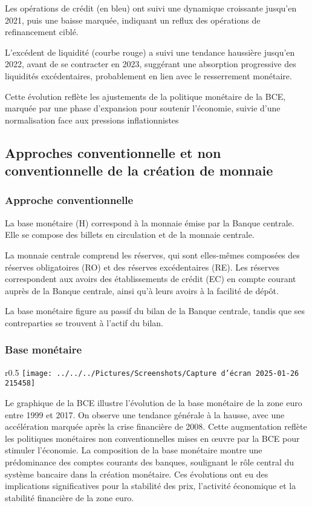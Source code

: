 \documentclass[a4paper, 12pt]{report}
\begin{document}
Les opérations de crédit (en bleu) ont suivi une dynamique croissante jusqu’en 2021, puis une baisse marquée, indiquant un reflux des opérations de refinancement ciblé.  

L’excédent de liquidité (courbe rouge) a suivi une tendance haussière jusqu’en 2022, avant de se contracter en 2023, suggérant une absorption progressive des liquidités excédentaires, probablement en lien avec le resserrement monétaire.  

Cette évolution reflète les ajustements de la politique monétaire de la BCE, marquée par une phase d’expansion pour soutenir l’économie, suivie d’une normalisation face aux pressions inflationnistes

\subsection{Approches conventionnelle et non conventionnelle de la création de monnaie}
	
\subsubsection{Approche conventionnelle}



La base monétaire (H) correspond à la monnaie émise par la Banque centrale. Elle se compose des billets en circulation et de la monnaie centrale.

La monnaie centrale comprend les réserves, qui sont elles-mêmes composées des réserves obligatoires (RO) et des réserves excédentaires (RE). Les réserves correspondent aux avoirs des établissements de crédit (EC) en compte courant auprès de la Banque centrale, ainsi qu'à leurs avoirs à la facilité de dépôt.

La base monétaire figure au passif du bilan de la Banque centrale, tandis que ses contreparties se trouvent à l'actif du bilan.
	
\subsubsection{Base monétaire}
	
\begin{wrapfigure}{r}{0.5\textwidth}
	\centering
\texttt{[image: ../../../Pictures/Screenshots/Capture d'écran 2025-01-26 215458]}
\end{wrapfigure}

Le graphique de la BCE illustre l'évolution de la base monétaire de la zone euro entre 1999 et 2017. On observe une tendance générale à la hausse, avec une accélération marquée après la crise financière de 2008. Cette augmentation reflète les politiques monétaires non conventionnelles mises en œuvre par la BCE pour stimuler l'économie. La composition de la base monétaire montre une prédominance des comptes courants des banques, soulignant le rôle central du système bancaire dans la création monétaire. Ces évolutions ont eu des implications significatives pour la stabilité des prix, l'activité économique et la stabilité financière de la zone euro.
\end{document}

